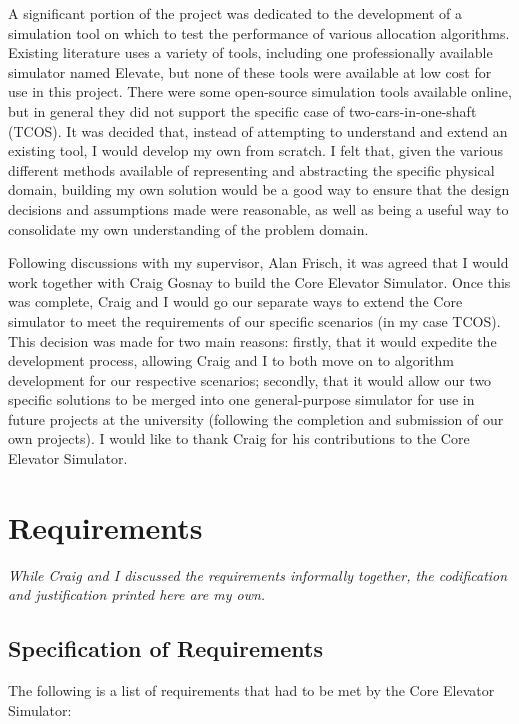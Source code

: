 \documentclass{UoYCSproject}
\begin{document}
A significant portion of the project was dedicated to the development of a simulation tool on which to test the performance of various allocation algorithms.  Existing literature uses a variety of tools, including one professionally available simulator named Elevate, but none of these tools were available at low cost for use in this project.  There were some open-source simulation tools available online, but in general they did not support the specific case of two-cars-in-one-shaft (TCOS).  It was decided that, instead of attempting to understand and extend an existing tool, I would develop my own from scratch.  I felt that, given the various different methods available of representing and abstracting the specific physical domain, building my own solution would be a good way to ensure that the design decisions and assumptions made were reasonable, as well as being a useful way to consolidate my own understanding of the problem domain.

Following discussions with my supervisor, Alan Frisch, it was agreed that I would work together with Craig Gosnay to build the Core Elevator Simulator.  Once this was complete, Craig and I would go our separate ways to extend the Core simulator to meet the requirements of our specific scenarios (in my case TCOS).  This decision was made for two main reasons: firstly, that it would expedite the development process, allowing Craig and I to both move on to algorithm development for our respective scenarios; secondly, that it would allow our two specific solutions to be merged into one general-purpose simulator for use in future projects at the university (following the completion and submission of our own projects).  I would like to thank Craig for his contributions to the Core Elevator Simulator.

\section{Requirements}

\textit{While Craig and I discussed the requirements informally together, the codification and justification printed here are my own.}

\subsection{Specification of Requirements}

The following is a list of requirements that had to be met by the Core Elevator Simulator:
\end{document}
